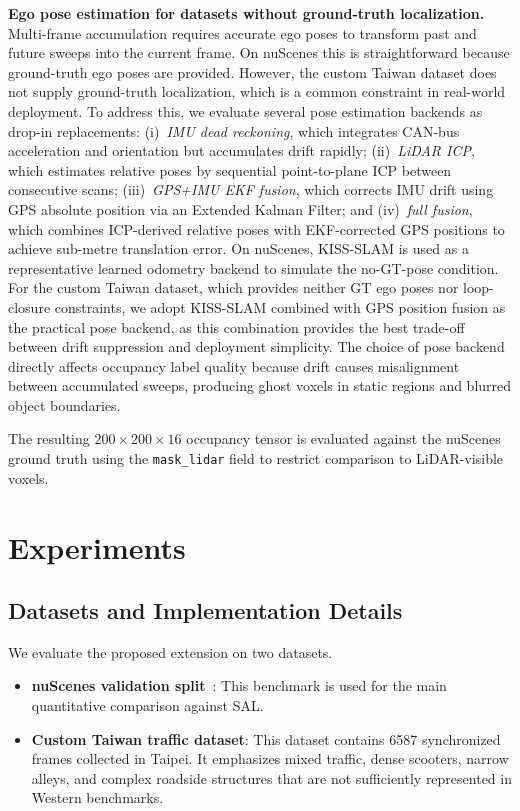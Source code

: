 \documentclass[conference]{IEEEtran}
\begin{document}
\textbf{Ego pose estimation for datasets without ground-truth localization.} Multi-frame accumulation requires accurate ego poses to transform past and future sweeps into the current frame. On nuScenes this is straightforward because ground-truth ego poses are provided. However, the custom Taiwan dataset does not supply ground-truth localization, which is a common constraint in real-world deployment. To address this, we evaluate several pose estimation backends as drop-in replacements: (i)~\emph{IMU dead reckoning}, which integrates CAN-bus acceleration and orientation but accumulates drift rapidly; (ii)~\emph{LiDAR ICP}, which estimates relative poses by sequential point-to-plane ICP between consecutive scans; (iii)~\emph{GPS+IMU EKF fusion}, which corrects IMU drift using GPS absolute position via an Extended Kalman Filter; and (iv)~\emph{full fusion}, which combines ICP-derived relative poses with EKF-corrected GPS positions to achieve sub-metre translation error. On nuScenes, KISS-SLAM is used as a representative learned odometry backend to simulate the no-GT-pose condition. For the custom Taiwan dataset, which provides neither GT ego poses nor loop-closure constraints, we adopt KISS-SLAM combined with GPS position fusion as the practical pose backend, as this combination provides the best trade-off between drift suppression and deployment simplicity. The choice of pose backend directly affects occupancy label quality because drift causes misalignment between accumulated sweeps, producing ghost voxels in static regions and blurred object boundaries.

The resulting $200 \times 200 \times 16$ occupancy tensor is evaluated against the nuScenes ground truth using the \texttt{mask\_lidar} field to restrict comparison to LiDAR-visible voxels.

\section{Experiments}
\subsection{Datasets and Implementation Details}
We evaluate the proposed extension on two datasets.
\begin{itemize}
  \item \textbf{nuScenes validation split}~\cite{nuscenes}: This benchmark is used for the main quantitative comparison against SAL.
  \item \textbf{Custom Taiwan traffic dataset}: This dataset contains 6587 synchronized frames collected in Taipei. It emphasizes mixed traffic, dense scooters, narrow alleys, and complex roadside structures that are not sufficiently represented in Western benchmarks.
\end{itemize}
\end{document}
